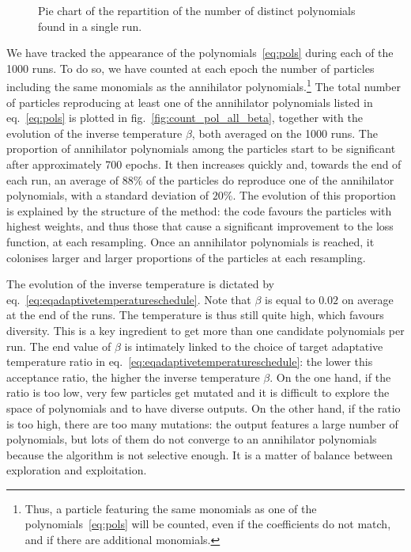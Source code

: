 \documentclass[11pt,a4paper]{article}
\begin{document}
	\begin{figure}[b!]
		\centering
		
		\caption{Pie chart of the repartition of the number of distinct polynomials found in a single run.}
		\label{fig:piechart}
	\end{figure}
	  
	We have tracked the appearance of the polynomials~\eqref{eq:pols} during each of the 1000 runs. To do so, we have counted at each epoch the number of particles including the same monomials as the annihilator polynomials.\footnote{Thus, a particle featuring the same monomials as one of the polynomials~\eqref{eq:pols} will be counted, even if the coefficients do not match, and if there are additional monomials.} The total number of particles reproducing at least one of the annihilator polynomials listed in eq.~\eqref{eq:pols} is plotted in fig.~\ref{fig:count_pol_all_beta}, together with the evolution of the inverse temperature $\beta$, both averaged on the 1000 runs. The proportion of annihilator polynomials among the particles start to be significant after approximately 700 epochs. It then increases quickly and, towards the end of each run, an average of $88\%$ of the particles do reproduce one of the annihilator polynomials, with a standard deviation of $20\%$. The evolution of this proportion is explained by the structure of the method: the code favours the particles with highest weights, and thus those that cause a significant improvement to the loss function, at each resampling. Once an annihilator polynomials is reached, it colonises larger and larger proportions of the particles at each resampling.

	The evolution of the inverse temperature is dictated by eq.~\eqref{eq:eqadaptivetemperatureschedule}. Note that $\beta$ is equal to $0.02$ on average at the end of the runs. The temperature is thus still quite high, which favours diversity. This is a key ingredient to get more than one candidate polynomials per run. The end value of $\beta$ is intimately linked to the choice of target adaptative temperature ratio in eq.~\eqref{eq:eqadaptivetemperatureschedule}: the lower this acceptance ratio, the higher the inverse temperature $\beta$. On the one hand, if the ratio is too low, very few particles get mutated and it is difficult to explore the space of polynomials and to have diverse outputs. On the other hand, if the ratio is too high, there are too many mutations: the output features a large number of polynomials, but lots of them do not converge to an annihilator polynomials because the algorithm is not selective enough. It is a matter of balance between exploration and exploitation.
\end{document}
